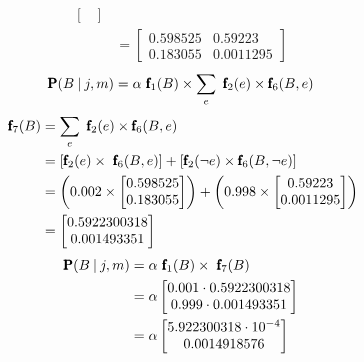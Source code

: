 \documentclass[a4paper, 12pt, one column, aas_macros]{article}
\newcommand\given[1][]{\:#1\vert\:}
\begin{document}
\begin{enumerate}[label=\alph*]
\begin{align*}
\begin{bmatrix}
             \end{bmatrix} \\
             &= \begin{bmatrix}
             0.598525 & 0.59223 \\ 0.183055 & 0.0011295
             \end{bmatrix}
          \end{align*}
          \begin{align*}
              \text{\pmb{P}}(B\given j, m) = \alpha \text{ \pmb f}_{1}(B)\times\sum_{e}\text{ \pmb f}_{2}(e)\times\text{\pmb f}_{6}(B, e)
          \end{align*}
          \begin{align*}
              \text{ \pmb f}_{7}(B) &= \sum_{e}\text{ \pmb f}_{2}(e)\times\text{\pmb f}_{6}(B, e) \\
              &= [\text{\pmb f}_{2}(e)\times\text{ \pmb f}_{6}(B, e)] + [\text{\pmb f}_{2}(\neg e)\times\text{\pmb f}_{6}(B, \neg e)] \\
              &= \left(0.002 \times \begin{bmatrix}
              0.598525 \\ 0.183055 
              \end{bmatrix}\right) + \left(0.998 \times \begin{bmatrix}
              0.59223 \\ 0.0011295
              \end{bmatrix}\right) \\
              &= \begin{bmatrix}
              0.5922300318 \\ 0.001493351
              \end{bmatrix}
          \end{align*}
          \begin{align*}
              \text{\pmb{P}}(B\given j, m) &= \alpha \text{ \pmb f}_{1}(B) \times \text{ \pmb f}_{7}(B) \\
              &= \alpha \begin{bmatrix}
              0.001 \cdot  0.5922300318 \\ 0.999 \cdot 0.001493351
              \end{bmatrix} \\
              &= \alpha \begin{bmatrix}
              5.922300318 \cdot 10^{-4} \\ 0.0014918576
              \end{bmatrix}

\end{align*}
\end{enumerate}
\end{document}
